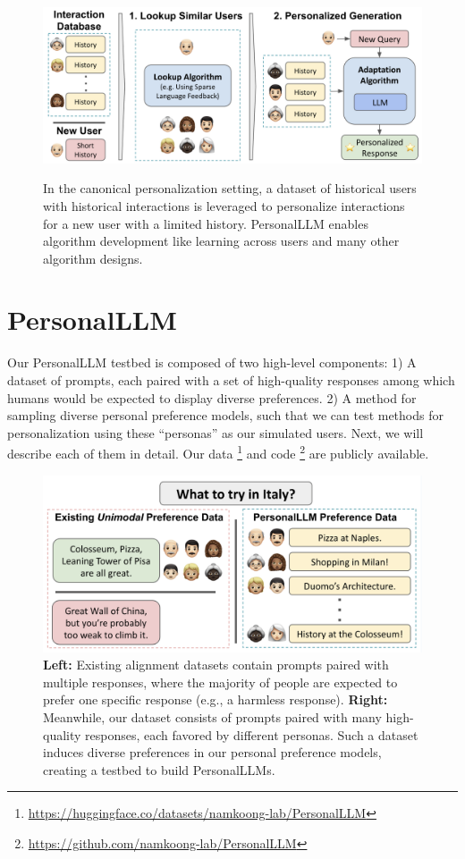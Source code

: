 \begin{figure}[t]
    \centering
\textbf{}    \includegraphics[width = \textwidth]{figures/metalearn_fig.png}
    \caption{In the canonical personalization setting, a dataset of historical users with historical interactions is leveraged to personalize interactions for a new user with a limited history. \textsf{PersonalLLM} enables algorithm development like learning across users and many other algorithm designs.}
    \label{fig:metalearn}
\end{figure}

\section{PersonalLLM}\label{sec:dataset}

Our \textsf{PersonalLLM} testbed is composed of two high-level components:
1) A dataset of prompts, each paired with a set of high-quality responses among which humans would be expected to display diverse preferences. 
2) A method for sampling diverse personal preference models, such that we can test methods for personalization using these ``personas'' as our simulated users.
Next, we will describe each of them in detail.  Our data \footnote{\url{https://huggingface.co/datasets/namkoong-lab/PersonalLLM}} and code \footnote{\url{https://github.com/namkoong-lab/PersonalLLM}} are publicly available.

\begin{figure}[t]
    \centering
    \includegraphics[width = \textwidth]{figures/data_example.png}
    \caption{\textbf{Left:} Existing alignment datasets contain prompts paired with multiple responses, where the majority of people are expected to prefer one specific response (e.g., a harmless response). \textbf{Right:} Meanwhile, our dataset consists of prompts paired with many high-quality responses, each favored by different personas. Such a dataset induces diverse preferences in our personal preference models, creating a testbed to build \textsf{PersonalLLM}s.}
    \label{fig:PersonalLLM}
\end{figure}

